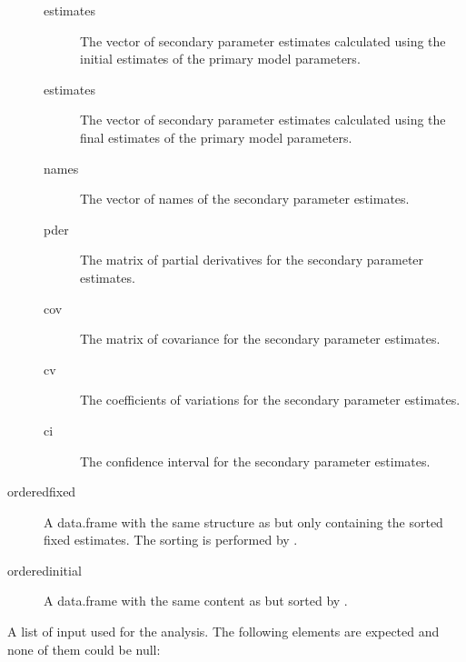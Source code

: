 \begin{Arguments}
\begin{ldescription}
\begin{description}
\begin{description}
\item[estimates] The vector of secondary parameter estimates calculated
using the initial estimates of the primary model parameters.
\item[estimates] The vector of secondary parameter estimates calculated
using the final estimates of the primary model parameters.
\item[names] The vector of names of the secondary parameter estimates.
\item[pder] The matrix of partial derivatives for the secondary
parameter estimates.
\item[cov] The matrix of covariance for the secondary parameter
estimates.
\item[cv] The coefficients of variations for the secondary parameter
estimates.
\item[ci] The confidence interval for the secondary parameter
estimates.

\end{description}


\item[orderedfixed] A data.frame with the same structure as
 but only containing the sorted fixed estimates.
The sorting is performed by .
\item[orderedinitial] A data.frame with the same content as
 but sorted by .

\end{description}


\item[\code{files}] A list of input used for the analysis. The following elements are
expected and none of them could be null: \begin{description}


\end{description}
\end{ldescription}
\end{Arguments}
